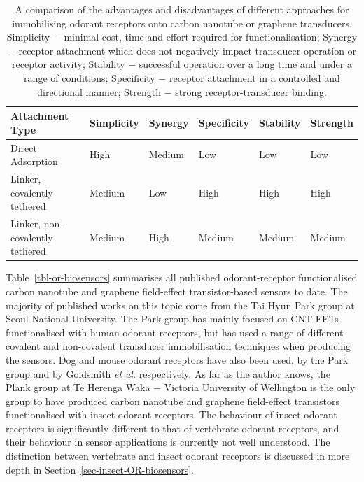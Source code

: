 \documentclass[
  a4paper,
]{scrbook}
\begin{document}
\hypertarget{tbl-functionalisation-types}{}
\begin{longtable}[t]{>{\raggedright\arraybackslash}p{5.4cm}>{\raggedright\arraybackslash}p{1.45cm}>{\raggedright\arraybackslash}p{1.3cm}>{\raggedright\arraybackslash}p{1.45cm}>{\raggedright\arraybackslash}p{1.3cm}>{\raggedright\arraybackslash}p{1.3cm}}
\caption{\label{tbl-functionalisation-types}A comparison of the advantages and disadvantages of different approaches
for immobilising odorant receptors onto carbon nanotube or graphene
transducers. Simplicity \(-\) minimal cost, time and effort required for
functionalisation; Synergy \(-\) receptor attachment which does not
negatively impact transducer operation or receptor activity; Stability
\(-\) successful operation over a long time and under a range of
conditions; Specificity \(-\) receptor attachment in a controlled and
directional manner; Strength \(-\) strong receptor-transducer binding. }\tabularnewline

\toprule
Attachment Type & Simplicity & Synergy & Specificity & Stability & Strength\\
\midrule
Direct Adsorption & High & Medium & Low & Low & Low\\
Linker, covalently tethered & Medium & Low & High & High & High\\
Linker, non-covalently tethered & Medium & High & Medium & Medium & Medium\\
\bottomrule
\end{longtable}

Table~\ref{tbl-or-biosensors} summarises all published odorant-receptor
functionalised carbon nanotube and graphene field-effect
transistor-based sensors to date. The majority of published works on
this topic come from the Tai Hyun Park group at Seoul National
University. The Park group has mainly focused on CNT FETs functionalised
with human odorant receptors, but has used a range of different covalent
and non-covalent transducer immobilisation techniques when producing the
sensors. Dog and mouse odorant receptors have also been used, by the
Park group and by Goldsmith \emph{et al.} respectively. As far as the
author knows, the Plank group at Te Herenga Waka \(-\) Victoria
University of Wellington is the only group to have produced carbon
nanotube and graphene field-effect transistors functionalised with
insect odorant receptors. The behaviour of insect odorant receptors is
significantly different to that of vertebrate odorant receptors, and
their behaviour in sensor applications is currently not well understood.
The distinction between vertebrate and insect odorant receptors is
discussed in more depth in Section~\ref{sec-insect-OR-biosensors}.
\end{document}
